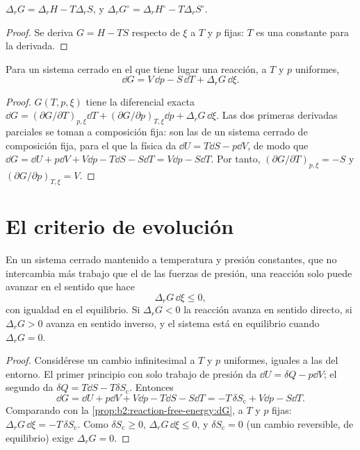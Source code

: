\begin{proposition}\label{prop:b2:reaction-free-energy:g-h-s}
$\Delta_r G = \Delta_r H - T\Delta_r S$, y $\Delta_r G^\circ = \Delta_r
H^\circ - T\Delta_r S^\circ$.
\end{proposition}

\begin{proof}
Se deriva $G = H - TS$ respecto de $\xi$ a $T$ y $p$ fijas: $T$
es una constante para la derivada.
\end{proof}

\begin{proposition}\label{prop:b2:reaction-free-energy:dG}
Para un sistema cerrado en el que tiene lugar una reacción, a $T$ y $p$
uniformes,
\[
  \dd G = V\,\dd p - S\,\dd T + \Delta_r G\,\dd\xi .
\]
\end{proposition}

\begin{proof}
$G(T, p, \xi)$ tiene la diferencial exacta $\dd G = (\partial G/\partial
T)_{p,\xi}\dd T + (\partial G/\partial p)_{T,\xi}\dd p + \Delta_r G\,\dd\xi$.
Las dos primeras derivadas parciales se toman a composición fija: son
las de un sistema cerrado de composición fija, para el que la física da
$\dd U = T\dd S - p\dd V$, de modo que $\dd G = \dd U + p\dd V + V\dd p - T\dd S
- S\dd T = V\dd p - S\dd T$. Por tanto, $(\partial G/\partial T)_{p,\xi} = -S$
y $(\partial G/\partial p)_{T,\xi} = V$.
\end{proof}

\section{El criterio de evolución}

\begin{theorem}\label{thm:b2:reaction-free-energy:evolution}
En un sistema cerrado mantenido a temperatura y presión constantes, que no intercambia
más trabajo que el de las fuerzas de presión, una reacción solo puede avanzar en
el sentido que hace
\[
  \Delta_r G\,\dd\xi \leq 0 ,
\]
con igualdad en el equilibrio. Si $\Delta_r G < 0$ la reacción avanza en sentido
directo, si $\Delta_r G > 0$ avanza en sentido inverso, y el sistema está en
equilibrio cuando $\Delta_r G = 0$.
\end{theorem}

\begin{proof}
Considérese un cambio infinitesimal a $T$ y $p$ uniformes, iguales a las del
entorno. El primer principio con solo trabajo de presión da $\dd U = \delta Q
- p\dd V$; el segundo da $\delta Q = T\dd S - T\delta S_{\text{c}}$. Entonces
\[
  \dd G = \dd U + p\dd V + V\dd p - T\dd S - S\dd T = -T\,\delta
  S_{\text{c}} + V\dd p - S\dd T .
\]
Comparando con la \cref{prop:b2:reaction-free-energy:dG}, a $T$ y $p$ fijas:
$\Delta_r G\,\dd\xi = -T\,\delta S_{\text{c}}$. Como $\delta S_{\text{c}}
\geq 0$, $\Delta_r G\,\dd\xi \leq 0$, y $\delta S_{\text{c}} = 0$ (un
cambio reversible, de equilibrio) exige $\Delta_r G = 0$.
\end{proof}

